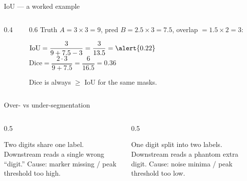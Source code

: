 \documentclass[10pt,aspectratio=169]{beamer}
\begin{document}
\begin{frame}{IoU --- a worked example}
  \begin{columns}[T]
    \begin{column}{0.4\textwidth}
    \end{column}
    \begin{column}{0.6\textwidth}
      Truth $A=3\times3=9$, pred $B=2.5\times3=7.5$, overlap $=1.5\times2=3$:
      \begin{mathbox}
        $\mathrm{IoU}=\dfrac{3}{9+7.5-3}=\dfrac{3}{13.5}=\alert{0.22}$\\[3pt]
        $\mathrm{Dice}=\dfrac{2\cdot3}{9+7.5}=\dfrac{6}{16.5}=0.36$
      \end{mathbox}
      Dice is always $\ge$ IoU for the same masks.
    \end{column}
  \end{columns}
\end{frame}

\begin{frame}{Over- vs under-segmentation}
  \begin{columns}[T]
    \begin{column}{0.5\textwidth}
      \begin{badbox}
        Two digits share one label. Downstream reads a single wrong ``digit.'' Cause:
        marker missing / peak threshold too high.
      \end{badbox}
    \end{column}
    \begin{column}{0.5\textwidth}
      \begin{badbox}
        One digit split into two labels. Downstream reads a phantom extra digit. Cause:
        noise minima / peak threshold too low.
      \end{badbox}
    \end{column}
  \end{columns}
\end{frame}
\end{document}
